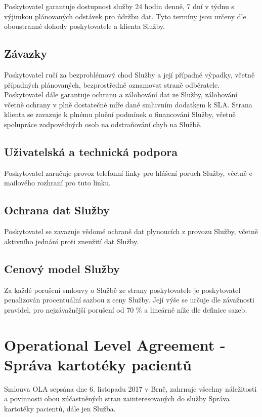 \documentclass[11pt, a4paper, titlepage]{article}
\begin{document}
	\noindent Poskytovatel garantuje dostupnost služby 24 hodin denně, 7 dní v týdnu s výjimkou plánovaných odstávek pro údržbu dat. Tyto termíny jsou určeny dle oboustranné dohody poskytovatele a klienta Služby. 

	\subsection*{Závazky}

	\noindent Poskytovatel ručí za bezproblémový chod Služby a její případné výpadky, včetně případných plánovaných, bezprostředně oznamovat straně odběratele. Poskytovatel dále garantuje ochranu a zálohování dat ze Služby, zálohování včetně ochrany v plně dostatečné míře dané smluvním dodatkem k SLA. Strana klienta se zavazuje k plnému plnění podmínek o financování Služby, včetně spolupráce zodpovědných osob na odstraňování chyb na Službě.

	\subsection*{Uživatelská a technická podpora}

	\noindent Poskytovatel zaručuje provoz telefonní linky pro hlášení poruch Služby, včetně e-mailového rozhraní pro tuto linku.

	\subsection*{Ochrana dat Služby}

	\noindent Poskytovatel se zavazuje vědomé ochraně dat plynoucích z provozu Služby, včetně aktivního jednání proti zneužití dat Služby.

	\subsection*{Cenový model Služby}

	\noindent Za každé porušení smlouvy o Službě ze strany poskytovatele je poskytovatel penalizován procentuální sazbou z ceny Služby. Její výše se určuje dle závažnosti pravidel, pro nejzávažnější porušení od 70 \% a lineárně níže dle definice sazeb.

	\section{Operational Level Agreement - Správa kartotéky pacientů}

	Smlouva OLA sepsána dne 6. listopadu 2017 v Brně, zahrnuje všechny náležitosti a povinnosti obou zúčastněných stran zainteresovaných do služby Správa kartotéky pacientů, dále jen Služba.
\end{document}

